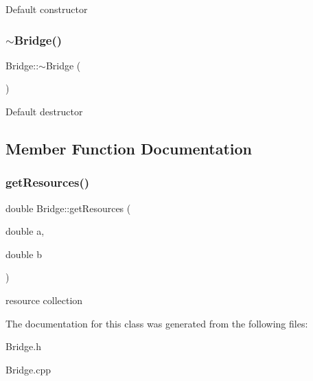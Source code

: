 Default constructor \mbox{\label{classBridge_a812b325fbb4f4b589e68f11f443a7ee4}} 
\subsubsection{\texorpdfstring{$\sim$\+Bridge()}{~Bridge()}}
{\footnotesize\ttfamily Bridge\+::$\sim$\+Bridge (\begin{DoxyParamCaption}{ }\end{DoxyParamCaption})}

Default destructor 

\subsection{Member Function Documentation}
\mbox{\label{classBridge_a1508c1c9cfb44850fea31afcb7f1e403}} 
\subsubsection{\texorpdfstring{get\+Resources()}{getResources()}}
{\footnotesize\ttfamily double Bridge\+::get\+Resources (\begin{DoxyParamCaption}\item[{double}]{a,  }\item[{double}]{b }\end{DoxyParamCaption})}

resource collection 

The documentation for this class was generated from the following files\+:\begin{DoxyCompactItemize}
\item 
Bridge.\+h\item 
Bridge.\+cpp\end{DoxyCompactItemize}
